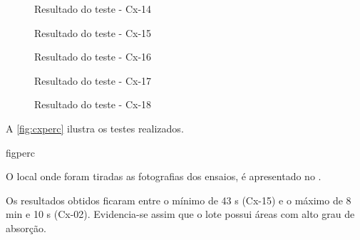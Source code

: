 \begin{figure}[htb!]\caption{Resultado do teste - Cx-14}\label{fig:cx14}\end{figure}
\begin{figure}[htb!]\caption{Resultado do teste - Cx-15}\label{fig:cx15}\end{figure}
\begin{figure}[htb!]\caption{Resultado do teste - Cx-16}\label{fig:cx16}\end{figure}
\begin{figure}[htb!]\caption{Resultado do teste - Cx-17}\label{fig:cx17}\end{figure}
\clearpage
\begin{figure}[htb!]\caption{Resultado do teste - Cx-18}\label{fig:cx18}\end{figure}


\FloatBarrier



A \cref{fig:cxperc} ilustra os testes realizados.


{figperc}

O local onde foram tiradas as fotografias
dos ensaios, é apresentado no .


\FloatBarrier
Os resultados obtidos ficaram entre o mínimo de 43 s (Cx-15) e o 
máximo de  8 min e 10 s (Cx-02). Evidencia-se assim que o  lote possui áreas com alto grau de absorção.
